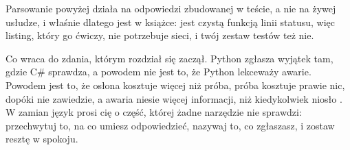 \begin{warning}
Parsowanie powyżej działa na odpowiedzi zbudowanej w teście, a nie na żywej
usłudze, i właśnie dlatego jest w książce:  jest
czystą funkcją linii statusu, więc listing, który go ćwiczy, nie potrzebuje
sieci, i twój zestaw testów też nie.
\end{warning}

\noindent
Co wraca do zdania, którym rozdział się zaczął. Python zgłasza wyjątek tam,
gdzie C\# sprawdza, a powodem nie jest to, że Python lekceważy awarie. Powodem
jest to, że osłona kosztuje więcej niż próba, próba kosztuje prawie nic,
dopóki nie zawiedzie, a awaria niesie więcej informacji, niż kiedykolwiek
niosło . W zamian język prosi cię o część, której żadne narzędzie
nie sprawdzi: przechwytuj to, na co umiesz odpowiedzieć, nazywaj to, co
zgłaszasz, i zostaw resztę w spokoju.
